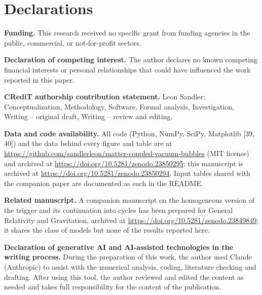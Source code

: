 \documentclass[preprint,12pt]{elsarticle}
\begin{document}
\section*{Declarations}
\noindent\textbf{Funding.} This research received no specific grant from funding agencies in the public, commercial, or not-for-profit sectors.

\noindent\textbf{Declaration of competing interest.} The author declares no known competing financial interests or personal relationships that could have influenced the work reported in this paper.

\noindent\textbf{CRediT authorship contribution statement.} Leon Sandler: Conceptualization, Methodology, Software, Formal analysis, Investigation, Writing -- original draft, Writing -- review and editing.

\noindent\textbf{Data and code availability.} All code (Python, NumPy, SciPy, Matplotlib [39, 40]) and the data behind every figure and table are at \url{https://github.com/sandlerleon/matter-coupled-vacuum-bubbles} (MIT license) and archived at \url{https://doi.org/10.5281/zenodo.23850295}; this manuscript is archived at \url{https://doi.org/10.5281/zenodo.23850294}. Input tables shared with the companion paper are documented as such in the README.

\noindent\textbf{Related manuscript.} A companion manuscript on the homogeneous version of the trigger and its continuation into cycles has been prepared for General Relativity and Gravitation, archived at \url{https://doi.org/10.5281/zenodo.23849849}; it shares the class of models but none of the results reported here.

\noindent\textbf{Declaration of generative AI and AI-assisted technologies in the writing process.} During the preparation of this work, the author used Claude (Anthropic) to assist with the numerical analysis, coding, literature checking and drafting. After using this tool, the author reviewed and edited the content as needed and takes full responsibility for the content of the publication.
\end{document}
